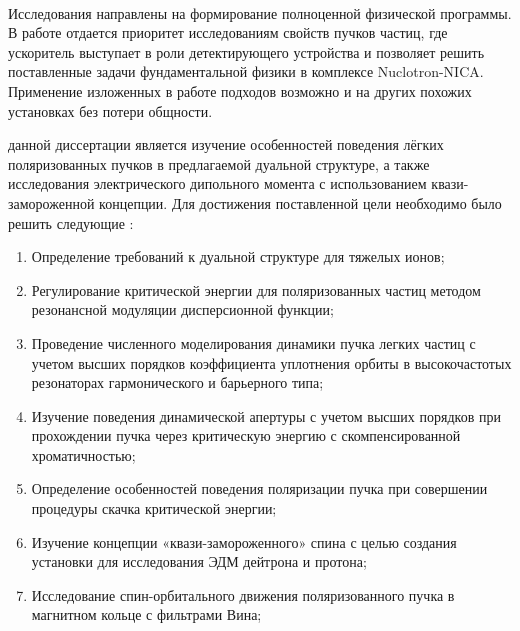 ~\\
\par {\actuality} Исследования направлены на формирование полноценной физической программы. В работе отдается приоритет исследованиям свойств пучков частиц, где ускоритель выступает в роли детектирующего устройства и позволяет решить поставленные задачи фундаментальной физики в комплексе Nuclotron-NICA. Применение изложенных в работе подходов возможно и на других похожих установках без потери общности.
~\\
\par {\aim} данной диссертации является изучение особенностей поведения лёгких поляризованных пучков в предлагаемой дуальной структуре, а также исследования электрического дипольного момента с использованием квази-замороженной концепции.
Для достижения поставленной цели необходимо было 
решить следующие {\tasks}:
\begin{enumerate}[beginpenalty=10000] %
	\item	Определение требований к дуальной структуре для тяжелых ионов;
	\item	Регулирование критической энергии для поляризованных частиц методом резонансной модуляции дисперсионной функции;
	\item	Проведение численного моделирования динамики пучка легких частиц с учетом высших порядков коэффициента уплотнения орбиты в высокочастотых резонаторах гармонического и барьерного типа;
	\item 	Изучение поведения динамической апертуры с учетом высших порядков при прохождении пучка через критическую энергию с скомпенсированной хроматичностью;
	\item 	Определение особенностей поведения поляризации пучка при совершении процедуры скачка критической энергии;
	\item 	Изучение концепции «квази-замороженного» спина с целью создания установки для исследования ЭДМ дейтрона и протона;
	\item	Исследование спин-орбитального движения поляризованного пучка в магнитном кольце с фильтрами Вина;
\end{enumerate}
